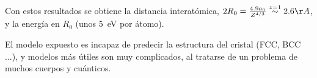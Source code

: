Con estos resultados se obtiene la distancia interatómica, $2R_0 =
\frac{4.9 a_0}{Z^{4/3}} \stackrel{z=1}{\sim}2.6 \AA$, y la energía en
$R_0$ (unos \SI{5}{\eV} por átomo). 

El modelo expuesto es incapaz de predecir la estructura del cristal
(FCC, BCC ...), y modelos más útiles son muy complicados, al tratarse
de un problema de muchos cuerpos y cuánticos.

